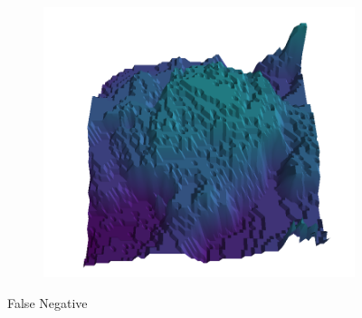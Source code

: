 \begin{figure}[H]
    \begin{subfigure}[b]{0.19\textwidth}
        \includegraphics[width=\linewidth]{../img/5/quarry/false_negative//patch-3d-majavi-colormap-4.png}
    \end{subfigure}  

\caption{False Negative}    
\end{figure}
